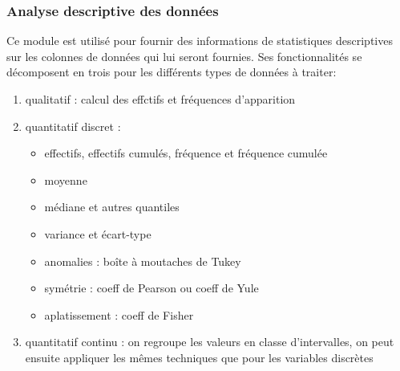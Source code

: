 			\subsubsection{Analyse descriptive des données}
				Ce module est utilisé pour fournir des informations de statistiques descriptives sur les colonnes de données qui lui seront fournies. Ses fonctionnalités se décomposent en trois pour les différents types de données à traiter:\\
				\begin{enumerate}
				\item qualitatif : calcul des effctifs et fréquences d'apparition
				\item quantitatif discret :\\
					\begin{itemize}
					\item effectifs, effectifs cumulés, fréquence et fréquence cumulée
					\item moyenne
					\item médiane et autres quantiles
					\item variance et écart-type
					\item anomalies : boîte à moutaches de Tukey
					\item symétrie : coeff de Pearson ou coeff de Yule
					\item aplatissement : coeff de Fisher
					\end{itemize}
				\item quantitatif continu : on regroupe les valeurs en classe d'intervalles, on peut ensuite appliquer les mêmes techniques que pour les variables discrètes
				\end{enumerate}
			

